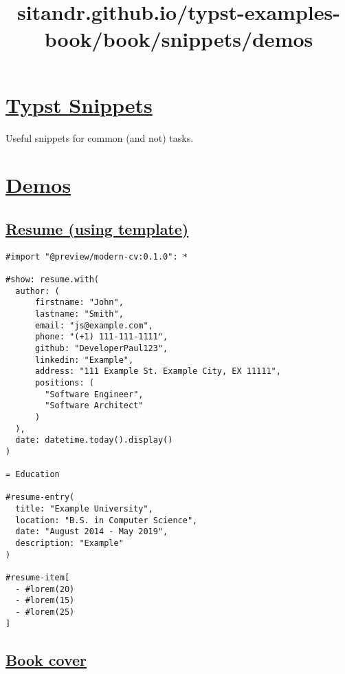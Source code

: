 \section{\texorpdfstring{\hyperref[typst-snippets]{Typst
Snippets}}{Typst Snippets}}\label{typst-snippets}

Useful snippets for common (and not) tasks.


\title{sitandr.github.io/typst-examples-book/book/snippets/demos}

\section{\texorpdfstring{\hyperref[demos]{Demos}}{Demos}}\label{demos}

\subsection{\texorpdfstring{\hyperref[resume-using-template]{Resume
(using
template)}}{Resume (using template)}}\label{resume-using-template}

\begin{verbatim}
#import "@preview/modern-cv:0.1.0": *

#show: resume.with(
  author: (
      firstname: "John", 
      lastname: "Smith",
      email: "js@example.com", 
      phone: "(+1) 111-111-1111",
      github: "DeveloperPaul123",
      linkedin: "Example",
      address: "111 Example St. Example City, EX 11111",
      positions: (
        "Software Engineer",
        "Software Architect"
      )
  ),
  date: datetime.today().display()
)

= Education

#resume-entry(
  title: "Example University",
  location: "B.S. in Computer Science",
  date: "August 2014 - May 2019",
  description: "Example"
)

#resume-item[
  - #lorem(20)
  - #lorem(15)
  - #lorem(25)
]
\end{verbatim}

\pandocbounded{}

\subsection{\texorpdfstring{\hyperref[book-cover]{Book
cover}}{Book cover}}\label{book-cover}

